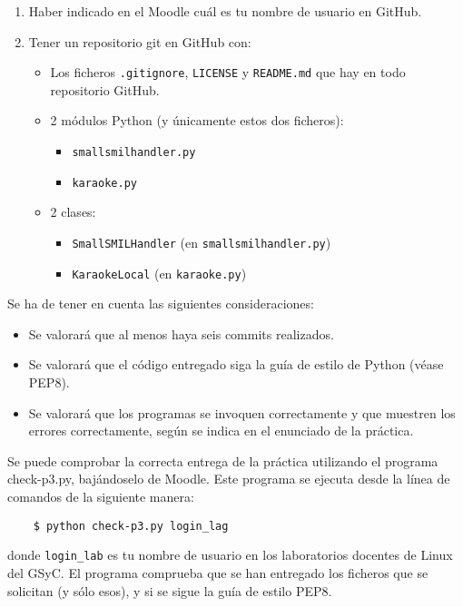 \documentclass[11pt,a4paper]{article}
\begin{document}
\begin{enumerate}
  \item Haber indicado en el Moodle cuál es tu nombre de usuario en GitHub.
  \item Tener un repositorio git en GitHub con:
  \begin{itemize}
    \item Los ficheros \texttt{.gitignore}, \texttt{LICENSE} y \texttt{README.md} que hay en todo repositorio GitHub.
    \item 2 módulos Python (y únicamente estos dos ficheros):
    \begin{itemize}
      \item \texttt{smallsmilhandler.py}
      \item \texttt{karaoke.py}
    \end{itemize}
    \item 2 clases:
    \begin{itemize}
      \item \texttt{SmallSMILHandler} (en \texttt{smallsmilhandler.py})
      \item \texttt{KaraokeLocal} (en \texttt{karaoke.py})
    \end{itemize}
  \end{itemize}
\end{enumerate}

Se ha de tener en cuenta las siguientes consideraciones:
\begin{itemize}
  \item Se valorará que al menos haya seis commits realizados.
  \item Se valorará que el código entregado siga la guía de estilo de Python (véase PEP8).
  \item Se valorará que los programas se invoquen correctamente y que muestren los errores correctamente, según se indica en el enunciado de la práctica.
\end{itemize}

Se puede comprobar la correcta entrega de la práctica utilizando el programa check-p3.py, bajándoselo de Moodle. Este programa se ejecuta desde la línea de comandos de la siguiente manera:
\begin{verbatim}
	$ python check-p3.py login_lag
\end{verbatim}

donde \texttt{login\_lab} es tu nombre de usuario en los laboratorios docentes de Linux del GSyC. El programa comprueba que se han entregado los ficheros que se solicitan (y sólo esos), y si se sigue la guía de estilo PEP8. 




\end{document}
